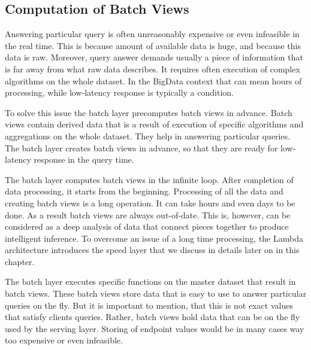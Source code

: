 \subsection{Computation of Batch Views}

Answering particular query is often unreasonably expensive or even infeasible in the real time.
This is because amount of available data is huge, and because this data is raw. 
Moreover, query answer demands usually a piece of information that is far away from what raw data describes.
It requires often execution of complex algorithms on the whole dataset.
In the BigData context that can mean hours of processing, while low-latency response is typically a condition.

To solve this issue the batch layer precomputes batch views in advance.
Batch views contain derived data that is a result of execution of specific algorithms and aggregations on the whole dataset.
They help in answering particular queries.
The batch layer creates batch views in advance, so that they are ready for low-latency response in the query time.

The batch layer computes batch views in the infinite loop.
After completion of data processing, it starts from the beginning.
Processing of all the data and creating batch views is a long operation.
It can take hours and even days to be done.
As a result batch views are always out-of-date.
This is, however, can be considered as a deep analysis of data that connect pieces together to produce intelligent inference.
To overcome an issue of a long time processing, the Lambda architecture introduces the speed layer that we discuss in details later on in this chapter.

The batch layer executes specific functions on the master dataset that result in batch views.
These batch views store data that is easy to use to answer particular queries on the fly.
But it is important to mention, that this is not exact values that satisfy clients queries.
Rather, batch views hold data that can be on the fly used by the serving layer.
Storing of endpoint values would be in many cases way too expensive or even infeasible.

